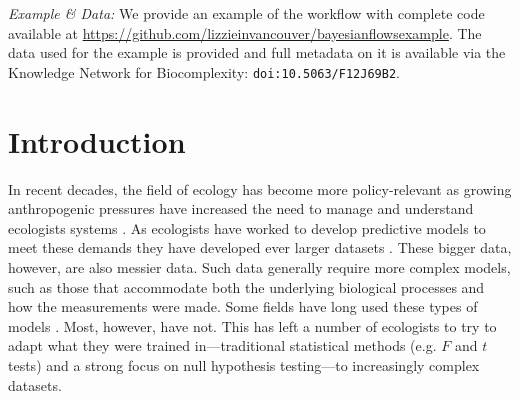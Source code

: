\documentclass[11pt]{article}
\begin{document}
\vspace{3ex}
\noindent\emph{Example \& Data:} We provide an example of the workflow with complete code available at \url{https://github.com/lizzieinvancouver/bayesianflowsexample}.  The data used for the example is provided and full metadata on it is available via the Knowledge Network for Biocomplexity: \verb|doi:10.5063/F12J69B2|. 



\setlength{\parindent}{0pt}
\setlength{\parskip}{7pt}

\newpage

\section*{Introduction}
In recent decades, the field of ecology has become more policy-relevant as growing anthropogenic pressures have increased the need to manage and understand ecologists systems  \citep{hak2016sustainable,lindenmayer2010science}. As ecologists have worked to develop predictive models to meet these demands they have developed ever larger datasets \citep{Hampton2013}. These bigger data, however, are also messier data. Such data generally require more complex models, such as those that accommodate both the underlying biological processes and how the measurements were made. Some fields have long used these types of models \citep[generally in fields focused on inferring population sizes for management,][]{muthuku2008,zheng2007,trijoulet2018,strinella2020potential}. Most, however, have not. This has left a number of ecologists to try to adapt what they were trained in---traditional statistical methods (e.g. $F$ and $t$ tests) and a strong focus on null hypothesis testing---to increasingly complex datasets. 
\end{document}

